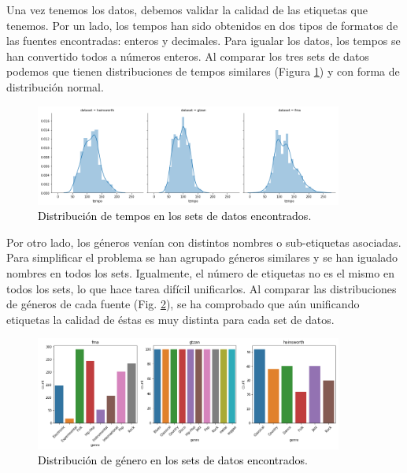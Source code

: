 Una vez tenemos los datos, debemos validar la calidad de las etiquetas que tenemos. Por un lado, los tempos han sido obtenidos en dos tipos de formatos de las fuentes encontradas: enteros y decimales. Para igualar los datos, los tempos se han convertido todos a números enteros. Al comparar los tres sets de datos podemos que tienen distribuciones de tempos similares (Figura \ref{Fig:distribucion_tempo_datasets}) y con forma de distribución normal.

\begin{figure}[htb]
  \centering
  \includegraphics[width=0.9\textwidth]{Figures/distribucion_tempo_datasets.png}
  \caption{\textcolor{black}{Distribución de tempos en los sets de datos encontrados}.}
  \label{Fig:distribucion_tempo_datasets}
\end{figure}

Por otro lado, los géneros venían con distintos nombres o sub-etiquetas asociadas. Para simplificar el problema se han agrupado géneros similares y se han igualado nombres en todos los sets. Igualmente, el número de etiquetas no es el mismo en todos los sets, lo que hace tarea difícil unificarlos. Al comparar las distribuciones de géneros de cada fuente (Fig. \ref{Fig:distribucion_genero_datasets_1}), se ha comprobado que aún unificando etiquetas la calidad de éstas es muy distinta para cada set de datos.

\begin{figure}[htb]
  \centering
  \includegraphics[width=0.9\textwidth]{Figures/distribucion_genero_datasets_1.png}
  \caption{\textcolor{black}{Distribución de género en los sets de datos encontrados}.}
  \label{Fig:distribucion_genero_datasets_1}
\end{figure}


